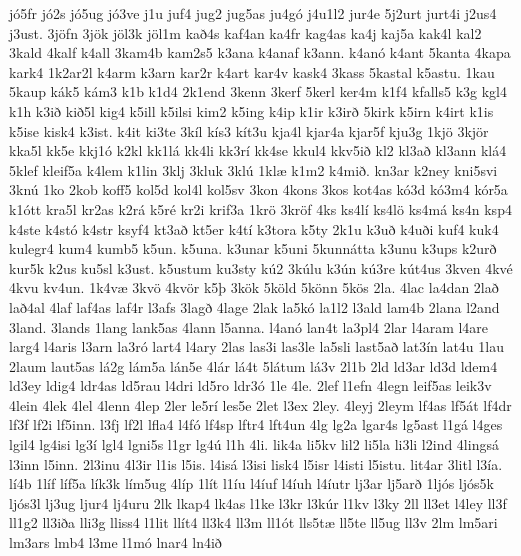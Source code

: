 {j^^f35fr
j^^f32s
j^^f35ug
j^^f33ve
j1u
juf4
jug2
jug5as
ju4g^^f3
j4u1l2
jur4e
5j2urt
jurt4i
j2us4
j3ust.
3j^^f6fn
3j^^f6k
j^^f6l3k
j^^f6l1m
ka^^f04s
kaf4an
ka4fr
kag4as
ka4j
kaj5a
kak4l
kal2
3kald
4kalf
k4all
3kam4b
kam2s5
k3ana
k4anaf
k3ann.
k4an^^f3
k4ant
5kanta
4kapa
kark4
1k2ar2l
k4arm
k3arn
kar2r
k4art
kar4v
kask4
3kass
5kastal
k5astu.
1kau
5kaup
k^^e1k5
k^^e1m3
k1b
k1d4
2k1end
3kenn
3kerf
5kerl
ker4m
k1f4
kfalls5
k3g
kgl4
k1h
k3i^^f0
ki^^f05l
kig4
k5ill
k5ilsi
kim2
k5ing
k4ip
k1ir
k3ir^^f0
5kirk
k5irn
k4irt
k1is
k5ise
kisk4
k3ist.
k4it
ki3te
3k^^edl
k^^eds3
k^^edt3u
kja4l
kjar4a
kjar5f
kju3g
1kj^^f6
3kj^^f6r
kka5l
kk5e
kkj1^^f3
k2kl
kk1l^^e1
kk4li
kk3r^^ed
kk4se
kkul4
kkv5i^^f0
kl2
kl3a^^f0
kl3ann
kl^^e14
5klef
kleif5a
k4lem
k1lin
3klj
3kluk
3kl^^fa
1kl^^e6
k1m2
k4mi^^f0.
kn3ar
k2ney
kni5svi
3kn^^fa
1ko
2kob
koff5
kol5d
kol4l
kol5sv
3kon
4kons
3kos
kot4as
k^^f33d
k^^f33m4
k^^f3r5a
k1^^f3tt
kra5l
kr2as
k2r^^e1
k5r^^e9
kr2i
krif3a
1kr^^f6
3kr^^f6f
4ks
ks4l^^ed
ks4l^^f6
ks4m^^e1
ks4n
ksp4
k4ste
k4st^^f3
k4str
ksyf4
kt3a^^f0
kt5er
k4t^^ed
k3tora
k5ty
2k1u
k3u^^f0
k4u^^f0i
kuf4
kuk4
kulegr4
kum4
kumb5
k5un.
k5una.
k3unar
k5uni
5kunn^^e1tta
k3unu
k3ups
k2ur^^f0
kur5k
k2us
ku5sl
k3ust.
k5ustum
ku3sty
k^^fa2
3k^^falu
k3^^fan
k^^fa3re
k^^fat4us
3kven
4kv^^e9
4kvu
kv4un.
1k4v^^e6
3kv^^f6
4kv^^f6r
k5^^fe
3k^^f6k
5k^^f6ld
5k^^f6nn
5k^^f6s
2la.
4lac
la4dan
2la^^f0
la^^f04al
4laf
laf4as
laf4r
l3afs
3lag^^f0
4lage
2lak
la5k^^f3
la1l2
l3ald
lam4b
2lana
l2and
3land.
3lands
1lang
lank5as
4lann
l5anna.
l4an^^f3
lan4t
la3pl4
2lar
l4aram
l4are
larg4
l4aris
l3arn
la3r^^f3
lart4
l4ary
2las
las3i
las3le
la5sli
last5a^^f0
lat3^^edn
lat4u
1lau
2laum
laut5as
l^^e12g
l^^e1m5a
l^^e1n5e
4l^^e1r
l^^e14t
5l^^e1tum
l^^e13v
2l1b
2ld
ld3ar
ld3d
ldem4
ld3ey
ldig4
ldr4as
ld5rau
l4dri
ld5ro
ldr3^^f3
1le
4le.
2lef
l1efn
4legn
leif5as
leik3v
4lein
4lek
4lel
4lenn
4lep
2ler
le5r^^ed
les5e
2let
l3ex
2ley.
4leyj
2leym
lf4as
lf5^^e1t
lf4dr
lf3f
lf2i
lf5inn.
l3fj
lf2l
lfla4
l4f^^f3
lf4sp
lftr4
lft4un
4lg
lg2a
lgar4s
lg5ast
l1g^^e1
l4ges
lgil4
lg4isi
lg3^^ed
lgl4
lgni5s
l1gr
lg4^^fa
l1h
4li.
lik4a
li5kv
lil2
li5la
li3li
l2ind
4lings^^e1
l3inn
l5inn.
2l3inu
4l3ir
l1is
l5is.
l4is^^e1
l3isi
lisk4
l5isr
l4isti
l5istu.
lit4ar
3litl
l3^^eda.
l^^ed4b
1l^^edf
l^^edf5a
l^^edk3k
l^^edm5ug
4l^^edp
1l^^edt
l1^^edu
l4^^eduf
l4^^eduh
l4^^edutr
lj3ar
lj5ar^^f0
1lj^^f3s
lj^^f3s5k
lj^^f3s3l
lj3ug
ljur4
lj4uru
2lk
lkap4
lk4as
l1ke
l3kr
l3k^^far
l1kv
l3ky
2ll
ll3et
l4ley
ll3f
ll1g2
ll3i^^f0a
lli3g
lliss4
l1lit
ll^^edt4
ll3k4
ll3m
ll1^^f3t
lls5t^^e6
ll5te
ll5ug
ll3v
2lm
lm5ari
lm3ars
lmb4
l3me
l1m^^f3
lnar4
ln4i^^f0
}
